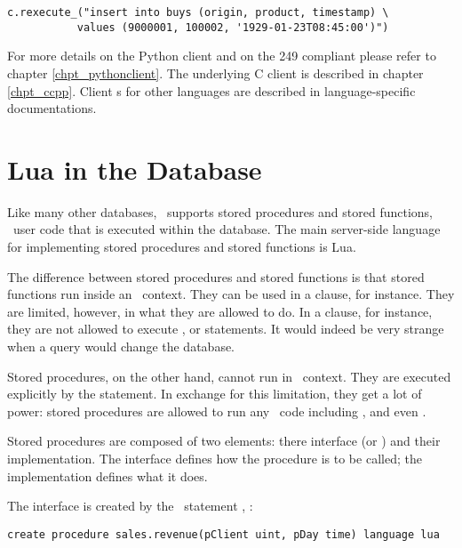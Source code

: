 \begin{minipage}{\textwidth}
\begin{python}
\begin{lstlisting}
c.rexecute_("insert into buys (origin, product, timestamp) \
           values (9000001, 100002, '1929-01-23T08:45:00')")
\end{lstlisting}
\end{python}
\end{minipage}

For more details on the Python client
and on the  249 compliant 
please refer to chapter \ref{chpt_pythonclient}.
The underlying C client \acronym{api} is described in
chapter \ref{chpt_ccpp}.
Client s for other languages are described
in language-specific documentations.

\section{Lua in the Database}
Like many other databases,
\nowdb\ supports
stored procedures and stored functions,
\ie\ user code that is executed within the database.
The main server-side language
for implementing stored procedures and
stored functions is Lua.

The difference between stored procedures
and stored functions is that stored functions
run inside an \sql\ context. They
can be used in a  clause,
for instance. They are limited, however,
in what they are allowed to do.
In a  clause, for instance,
they are not allowed to
execute ,  or 
statements.
It would indeed be very strange when
a query would change the database.

Stored procedures, on the other hand,
cannot run in \sql\ context. They are
executed explicitly by the 
statement. In exchange for this limitation,
they get a lot of power:
stored procedures are allowed to run
any \sql\ code including , 
and even .

Stored procedures are composed of two
elements: there interface (or )
and their implementation.
The interface defines how the procedure is
to be called; the implementation defines
what it does.

The interface is created by the \sql\ statement
, \eg:

\begin{sqlcode}
\begin{lstlisting}
create procedure sales.revenue(pClient uint, pDay time) language lua 
\end{lstlisting}
\end{sqlcode}

